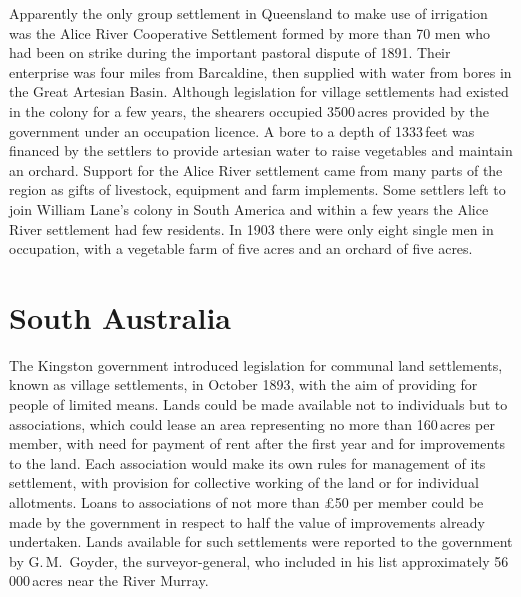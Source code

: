 Apparently the only group settlement in Queensland to make use of
irrigation was the Alice River Cooperative Settlement
 formed by more
than 70 men who had been on strike during the important pastoral
dispute of 1891.  Their enterprise was four miles from Barcaldine,
 then supplied with water from bores in the Great
Artesian Basin.  Although legislation for village settlements had
existed in the colony for a few years, the shearers occupied
3500\,acres provided by the government under an occupation licence.  A
bore to a depth of 1333\,feet was financed by the settlers to provide
artesian water to raise vegetables and maintain an orchard.  Support
for the Alice River settlement came from many parts of the region as
gifts of livestock, equipment and farm implements. Some settlers left
to join William Lane's colony in South America and within a few years
the Alice River settlement had few residents. In 1903 there were only
eight single men in occupation, with a vegetable farm of five acres
and an orchard of five acres.

\section*{South Australia}

The Kingston government introduced legislation for communal land
settlements, known as village settlements, in October 1893, with the
aim of providing for people of limited means.  Lands could be made
available not to individuals but to associations, which could lease an
area representing no more than 160\,acres per member, with need for
payment of rent after the first year and for improvements to the land.
Each association would make its own rules for management of its
settlement, with provision for collective working of the land or for
individual allotments.  Loans to associations of not more than
\pounds50 per member could be made by the government in respect to
half the value of improvements already undertaken.  Lands available
for such settlements were reported to the government by G.\,M.~Goyder,
\index{Goyder, G.\,M.} 
the surveyor-general, who included in his list approximately
56\,000\,acres near the River Murray.

